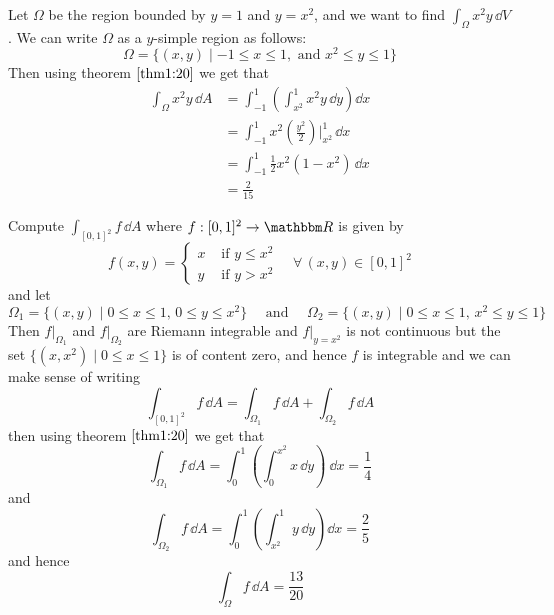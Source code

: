 \documentclass[Analysis-3]{subfiles}
\begin{document}
\begin{Eg}{}{}
    Let $\Omega$ be the region bounded by $y = 1$ and $y = x^2$, and we want to find $\int_{\Omega} x^2y \, \dd V$. We can write $\Omega$ as a $y$-simple region as follows: 
    \[
        \Omega = \{ (x,y) \mid -1 \leq x \leq 1, \mbox{ and } x^2 \leq y \leq 1 \}    
    \]
    Then using theorem $\ref{thm1:20}$ we get that 
    \begin{align*}
        \int_{\Omega} x^2y \, \dd A &= \int_{-1}^1 \left( \int_{x^2}^1 x^2y \, \dd y\right)\dd x \\ 
        &= \int_{-1}^1 x^2 \left( \frac{y^2}{2} \right)\bigg\vert_{x^2}^1 \, \dd x \\ 
        &= \int_{-1}^1 \frac{1}{2} x^2(1-x^2) \, \dd x \\ 
        &= \frac{2}{15}
    \end{align*}
\end{Eg}

\begin{Eg}{}{}
    Compute $\int_{[0,1]^2} f \, \dd A$ where $f : [0,1]^2 \to \R$ is given by
    \[
        f(x,y) = \begin{cases}
            x & \mbox{ if } y \leq x^2 \\ y & \mbox{ if } y > x^2 
        \end{cases} \quad \forall \, (x,y) \in [0,1]^2   
    \]
    and let 
    \[
        \Omega_1 = \{ (x,y) \mid 0 \leq x \leq 1, \, 0 \leq y \leq x^2 \} \quad \mbox{ and } \quad \Omega_2 = \{ (x,y) \mid 0 \leq x \leq 1, \, x^2 \leq y \leq 1 \}    
    \]
    Then $f\vert_{\Omega_1}$ and $f\vert_{\Omega_2}$ are Riemann integrable and $f\vert_{y=x^2}$ is not continuous but the set $\{ (x,x^2) \mid 0 \leq x \leq 1 \}$ is of content zero, and hence $f$ is integrable and we can make sense of writing 
    \[
        \int_{[0,1]^2} f \, \dd A = \int_{\Omega_1} f \, \dd A + \int_{\Omega_2} f \, \dd A     
    \]
    then using theorem $\ref{thm1:20}$ we get that 
    \[
        \int_{\Omega_1} f \, \dd A = \int_0^1 \left( \int_0^{x^2} x \, \dd y \right)\ \dd x = \frac{1}{4}     
    \]
    and 
    \[
        \int_{\Omega_2} f \, \dd A = \int_0^1 \left( \int_{x^2}^1 y \, \dd y\right)\dd x = \frac{2}{5}    
    \]
    and hence
    \[
        \int_{\Omega} f \, \dd A = \frac{13}{20}
    \]
\end{Eg}
\end{document}
